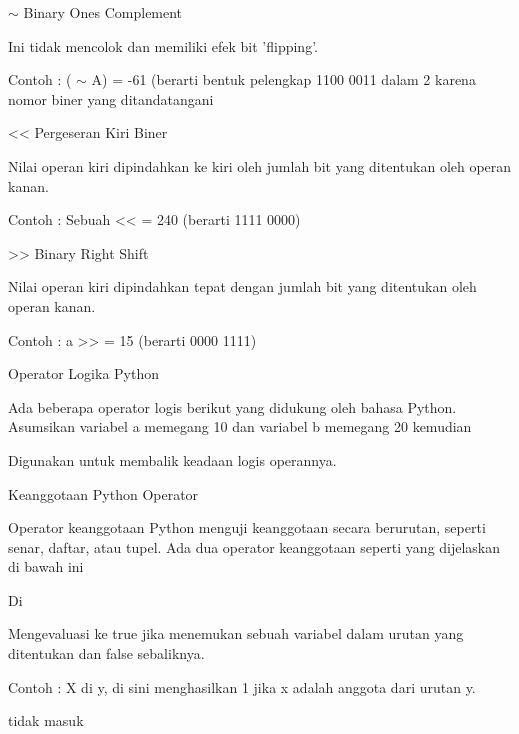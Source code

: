  $  \sim  $ Binary Ones Complement \par
\noindent 
Ini tidak mencolok dan memiliki efek bit 'flipping'. \par
\noindent 
Contoh : ( $  \sim  $ A) = -61 (berarti bentuk pelengkap 1100 0011 dalam 2 karena nomor biner yang ditandatangani \par
\vspace{12pt}
\noindent 
<< Pergeseran Kiri Biner \par
\noindent 
Nilai operan kiri dipindahkan ke kiri oleh jumlah bit yang ditentukan oleh operan kanan. \par
\noindent 
Contoh : Sebuah << = 240 (berarti 1111 0000) \par
\vspace{12pt}
\noindent 
>> Binary Right Shift \par
\noindent 
Nilai operan kiri dipindahkan tepat dengan jumlah bit yang ditentukan oleh operan kanan. \par
\noindent 
Contoh : a >> = 15 (berarti 0000 1111) \par
\vspace{12pt}
\noindent 
Operator Logika Python \par
\vspace{12pt}
\noindent 
Ada beberapa operator logis berikut yang didukung oleh bahasa Python. $  $Asumsikan variabel a memegang 10 dan variabel b memegang 20 kemudian \par
\vspace{12pt}
\noindent 
Digunakan untuk membalik keadaan logis operannya. \par
\vspace{12pt}
\noindent 
Keanggotaan Python Operator \par
\vspace{12pt}
\noindent 
Operator keanggotaan Python menguji keanggotaan secara berurutan, seperti senar, daftar, atau tupel. $  $Ada dua operator keanggotaan seperti yang dijelaskan di bawah ini \par
\vspace{12pt}
\noindent 
Di \par
\noindent 
Mengevaluasi ke true jika menemukan sebuah variabel dalam urutan yang ditentukan dan false sebaliknya. \par
\noindent 
Contoh : X di y, di sini menghasilkan 1 jika x adalah anggota dari urutan y. \par
\vspace{12pt}
\noindent 
tidak masuk \par
